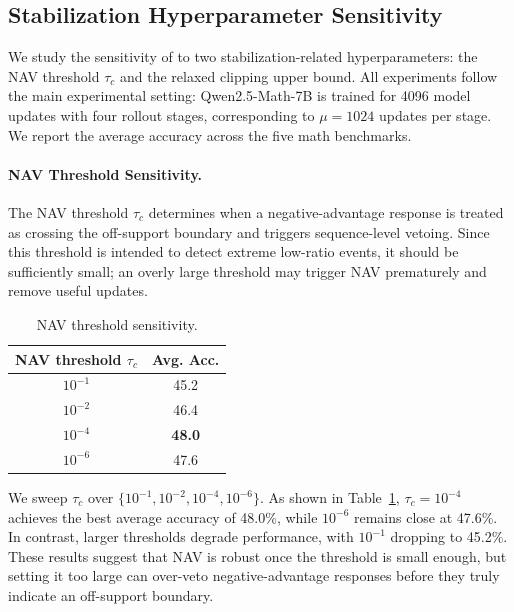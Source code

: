 \subsection{Stabilization Hyperparameter Sensitivity}
\label{app:stabilization_hyperparams}

We study the sensitivity of \ourmethod{} to two stabilization-related hyperparameters: the NAV threshold $\tau_c$ and the relaxed clipping upper bound. All experiments follow the main experimental setting: Qwen2.5-Math-7B is trained for 4096 model updates with four rollout stages, corresponding to $\mu=1024$ updates per stage. We report the average accuracy across the five math benchmarks.

\paragraph{NAV Threshold Sensitivity.}
The NAV threshold $\tau_c$ determines when a negative-advantage response is treated as crossing the off-support boundary and triggers sequence-level vetoing. Since this threshold is intended to detect extreme low-ratio events, it should be sufficiently small; an overly large threshold may trigger NAV prematurely and remove useful updates.

\begin{table}[!h]
\vspace{-10pt}
\centering
\small
\caption{NAV threshold sensitivity.}
\label{tab:nav_threshold_ablation}
\begin{tabular}{cc}
\toprule
NAV threshold $\tau_c$ & Avg. Acc. \\
\midrule
$10^{-1}$ & 45.2 \\
$10^{-2}$ & 46.4 \\
\rowcolor{gray!20}
$10^{-4}$ & \textbf{48.0} \\
$10^{-6}$ & 47.6 \\
\bottomrule
\end{tabular}
\vspace{-11pt}
\end{table}

We sweep $\tau_c$ over $\{10^{-1}, 10^{-2}, 10^{-4}, 10^{-6}\}$. As shown in Table~\ref{tab:nav_threshold_ablation}, $\tau_c=10^{-4}$ achieves the best average accuracy of 48.0\%, while $10^{-6}$ remains close at 47.6\%. In contrast, larger thresholds degrade performance, with $10^{-1}$ dropping to 45.2\%. These results suggest that NAV is robust once the threshold is small enough, but setting it too large can over-veto negative-advantage responses before they truly indicate an off-support boundary.

